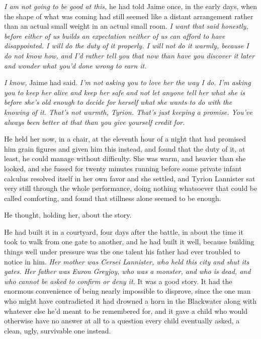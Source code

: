 \textit{I am not going to be good at this,} he had told Jaime once, in the early days, when the shape of what was coming had still seemed like a distant arrangement rather than an actual small weight in an actual small room. \textit{I want that said honestly, before either of us builds an expectation neither of us can afford to have disappointed. I will do the duty of it properly. I will not do it warmly, because I do not know how, and I’d rather tell you that now than have you discover it later and wonder what you’d done wrong to earn it.}

\textit{I know,} Jaime had said. \textit{I’m not asking you to love her the way I do. I’m asking you to keep her alive and keep her safe and not let anyone tell her what she is before she’s old enough to decide for herself what she wants to do with the knowing of it. That’s not warmth, Tyrion. That’s just keeping a promise. You’ve always been better at that than you give yourself credit for.}

He held her now, in a chair, at the eleventh hour of a night that had promised him grain figures and given him this instead, and found that the duty of it, at least, he could manage without difficulty. She was warm, and heavier than she looked, and she fussed for twenty minutes running before some private infant calculus resolved itself in her own favor and she settled, and Tyrion Lannister sat very still through the whole performance, doing nothing whatsoever that could be called comforting, and found that stillness alone seemed to be enough.

\sceneBreak

He thought, holding her, about the story.

He had built it in a courtyard, four days after the battle, in about the time it took to walk from one gate to another, and he had built it well, because building things well under pressure was the one talent his father had ever troubled to notice in him. \textit{Her mother was Cersei Lannister, who held this city and shut its gates. Her father was Euron Greyjoy, who was a monster, and who is dead, and who cannot be asked to confirm or deny it.} It was a good story. It had the enormous convenience of being nearly impossible to disprove, since the one man who might have contradicted it had drowned a horn in the Blackwater along with whatever else he’d meant to be remembered for, and it gave a child who would otherwise have no answer at all to a question every child eventually asked, a clean, ugly, survivable one instead.

